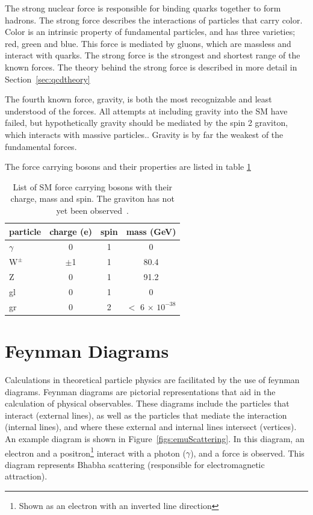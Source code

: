 The strong nuclear force is responsible for binding quarks together to form hadrons.  
The strong force describes the interactions of particles that carry color.  
Color is an intrinsic property of fundamental particles, and has three varieties; red, green and blue.
This force is mediated by gluons, which are massless and interact with quarks.  
The strong force is the strongest and shortest range of the known forces.  
The theory behind the strong force is described in more detail in Section~\ref{sec:qcdtheory}

The fourth known force, gravity, is both the most recognizable and least understood of the forces.  
All attempts at including gravity into the SM have failed, but hypothetically gravity should be mediated by the spin 2 graviton, which interacts with massive particles..
Gravity is by far the weakest of the fundamental forces. 

The force carrying bosons and their properties are listed in table \ref{table:SMbos}


\begin{table}
\begin{center}
\begin{tabular}{l|c|c|c}
\hline
\hline
particle & charge (e) & spin & mass (GeV)\\ \hline \hline
$\gamma$  & 0 & 1 & 0\\ 
$\mathrm{W^{\pm}}$ & $\pm$1 & 1 & 80.4\\
Z & 0 & 1 & 91.2\\ 
gl & 0 & 1 & 0 \\ 
gr & 0 & 2 & $<$ 6 $\times$ $\mathrm{10^{-38}}$ \\ 
\hline
\end{tabular}
\end{center}
\caption{List of SM force carrying bosons with their charge, mass and spin.  The graviton has not yet been observed~\cite{PDG-2014}.}
\label{table:SMbos}
\end{table}


\section{Feynman Diagrams}
Calculations in theoretical particle physics are facilitated by the use of feynman diagrams.  
Feynman diagrams are pictorial representations that aid in the calculation of physical observables.  
These diagrams include the particles that interact (external lines), as well as the particles that mediate the interaction (internal lines), 
and where these external and internal lines intersect (vertices).  
An example diagram is shown in Figure~\ref{figs:emuScattering}.  
In this diagram, an electron and a positron\footnote{Shown as an electron with an inverted line direction} interact with a photon ($\gamma$), and a force is observed.
This diagram represents Bhabha scattering (responsible for electromagnetic attraction).  

